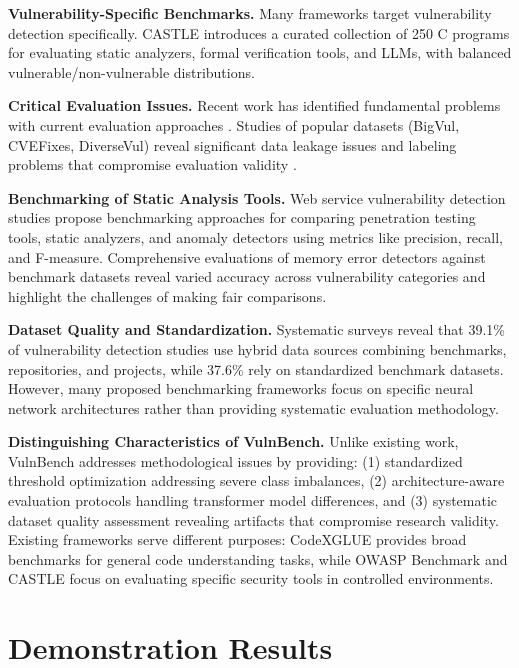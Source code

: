 \documentclass[letterpaper]{article}
\begin{document}
\textbf{Vulnerability-Specific Benchmarks.} Many frameworks target vulnerability detection specifically. CASTLE \citep{castle2025} introduces a curated collection of 250 C programs for evaluating static analyzers, formal verification tools, and LLMs, with balanced vulnerable/non-vulnerable distributions.

\textbf{Critical Evaluation Issues.} Recent work has identified fundamental problems with current evaluation approaches \citep{risse2025top}. Studies of popular datasets (BigVul, CVEFixes, DiverseVul) reveal significant data leakage issues and labeling problems that compromise evaluation validity \citep{ullah2024vulnerability}.

\textbf{Benchmarking of Static Analysis Tools.} Web service vulnerability detection studies \citep{antunes2010benchmarking} propose benchmarking approaches for comparing penetration testing tools, static analyzers, and anomaly detectors using metrics like precision, recall, and F-measure. Comprehensive evaluations of memory error detectors \citep{zhang2021evaluating} against benchmark datasets reveal varied accuracy across vulnerability categories and highlight the challenges of making fair comparisons.

\textbf{Dataset Quality and Standardization.} Systematic surveys \citep{systematic2024survey} reveal that 39.1\% of vulnerability detection studies use hybrid data sources combining benchmarks, repositories, and projects, while 37.6\% rely on standardized benchmark datasets. However, many proposed benchmarking frameworks \citep{lin2020deep} focus on specific neural network architectures rather than providing systematic evaluation methodology.

\textbf{Distinguishing Characteristics of VulnBench.} Unlike existing work, VulnBench addresses 
methodological issues by providing: (1) standardized threshold optimization addressing severe class imbalances, (2) architecture-aware evaluation protocols handling transformer model differences, and (3) systematic dataset quality assessment revealing artifacts that compromise research validity. Existing frameworks serve different purposes: CodeXGLUE provides broad benchmarks for general code understanding tasks, while OWASP Benchmark and CASTLE focus on evaluating specific security tools in controlled environments.

\section{Demonstration Results}
\end{document}
